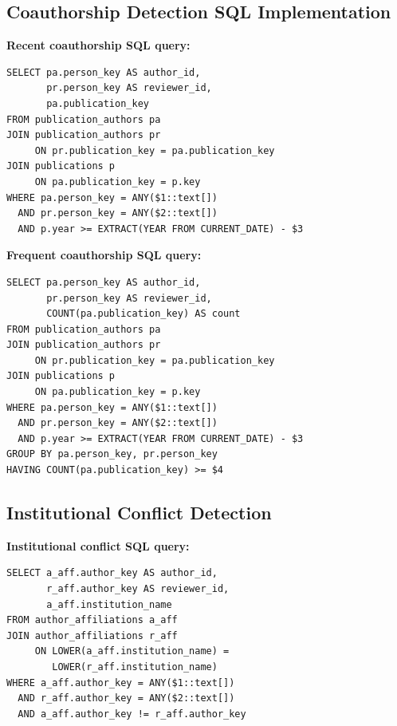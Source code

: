 \subsection{Coauthorship Detection SQL Implementation}
\textbf{Recent coauthorship SQL query:}
\begin{verbatim}
SELECT pa.person_key AS author_id, 
       pr.person_key AS reviewer_id, 
       pa.publication_key
FROM publication_authors pa
JOIN publication_authors pr 
     ON pr.publication_key = pa.publication_key
JOIN publications p 
     ON pa.publication_key = p.key
WHERE pa.person_key = ANY($1::text[])
  AND pr.person_key = ANY($2::text[])
  AND p.year >= EXTRACT(YEAR FROM CURRENT_DATE) - $3
\end{verbatim}

\textbf{Frequent coauthorship SQL query:}
\begin{verbatim}
SELECT pa.person_key AS author_id, 
       pr.person_key AS reviewer_id, 
       COUNT(pa.publication_key) AS count
FROM publication_authors pa
JOIN publication_authors pr 
     ON pr.publication_key = pa.publication_key
JOIN publications p 
     ON pa.publication_key = p.key
WHERE pa.person_key = ANY($1::text[])
  AND pr.person_key = ANY($2::text[])
  AND p.year >= EXTRACT(YEAR FROM CURRENT_DATE) - $3
GROUP BY pa.person_key, pr.person_key
HAVING COUNT(pa.publication_key) >= $4
\end{verbatim}

\subsection{Institutional Conflict Detection}
\textbf{Institutional conflict SQL query:}
\begin{verbatim}
SELECT a_aff.author_key AS author_id, 
       r_aff.author_key AS reviewer_id, 
       a_aff.institution_name
FROM author_affiliations a_aff
JOIN author_affiliations r_aff 
     ON LOWER(a_aff.institution_name) = 
        LOWER(r_aff.institution_name)
WHERE a_aff.author_key = ANY($1::text[])
  AND r_aff.author_key = ANY($2::text[])
  AND a_aff.author_key != r_aff.author_key
\end{verbatim} 